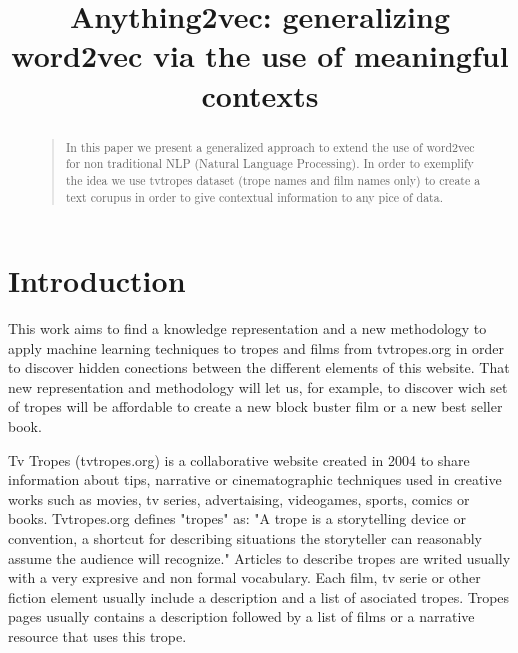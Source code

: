 \documentclass[letterpaper]{article}
\title{Anything2vec: generalizing word2vec via the use of meaningful
  contexts}
\begin{document}
 
\maketitle
\begin{abstract}
  \begin{quote}
In this paper we present a generalized approach to extend the use of word2vec for non traditional NLP (Natural Language Processing). In order to exemplify the idea we use tvtropes dataset (trope names and film names only) to create a text corupus in order to give contextual information to any pice of data.
\end{quote}
\end{abstract}





\section{Introduction}


This work aims to find a knowledge representation and a new methodology to apply machine learning techniques to tropes and films from tvtropes.org in order to discover hidden conections between the different elements of this website. That new representation and methodology will let us, for example, to discover wich set of tropes will be affordable to create a new block buster film or a new best seller book.   

Tv Tropes (tvtropes.org) is a collaborative website created in 2004 to share information about tips, narrative or cinematographic techniques used in creative works such as movies, tv series, advertaising, videogames, sports, comics or books. Tvtropes.org defines "tropes" as: "A trope is a storytelling device or convention, a shortcut for describing situations the storyteller can reasonably assume the audience will recognize." Articles to describe tropes are writed usually with a very expresive and non formal vocabulary. Each film, tv serie or other fiction element usually include a description and a list of asociated tropes. Tropes pages usually contains a description followed by a list of films or a narrative resource that uses this trope.   
\end{document}
